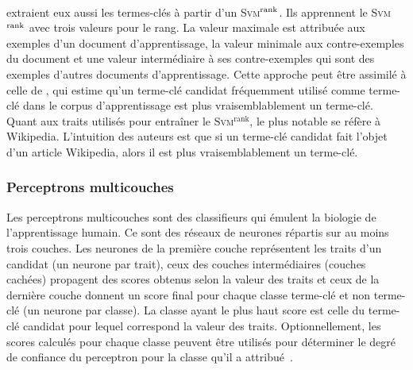         ~\\ extraient eux aussi les termes-clés à
        partir d'un \textsc{Svm}$^\textnormal{rank}$. Ils apprennent le
        \textsc{Svm}$^\textnormal{rank}$ avec trois valeurs pour le rang. La
        valeur maximale est attribuée aux exemples d'un document
        d'apprentissage, la valeur minimale aux contre-exemples du document et
        une valeur intermédiaire à ses contre-exemples qui sont des exemples
        d'autres documents d'apprentissage. Cette approche peut être assimilé à
        celle de , qui estime qu'un terme-clé
        candidat fréquemment utilisé comme terme-clé dans le corpus
        d'apprentissage est plus vraisemblablement un terme-clé. Quant aux
        traits utilisés pour entraîner le \textsc{Svm}$^\text{rank}$, le plus
        notable se réfère à Wikipedia. L'intuition des auteurs est que si un
        terme-clé candidat fait l'objet d'un article Wikipedia, alors il est
        plus vraisemblablement un terme-clé.

      \subsubsection{Perceptrons multicouches}
      \label{subsubsec:main-state_of_the_art-automatic_keyphrase_extraction-supervised_keyphrase_extraction-neural_network}
        Les perceptrons multicouches sont des classifieurs qui émulent la
        biologie de l'apprentissage humain. Ce sont des réseaux de neurones
        répartis sur au moins trois couches. Les neurones de la première couche
        représentent les traits d'un candidat (un neurone par trait), ceux des
        couches intermédiaires (couches cachées) propagent des scores obtenus
        selon la valeur des traits et ceux de la dernière couche donnent un
        score final pour chaque classe \og{}terme-clé\fg{} et \og{}non
        terme-clé\fg{} (un neurone par classe). La classe ayant le plus haut
        score est celle du terme-clé candidat pour lequel correspond la valeur
        des traits. Optionnellement, les scores calculés pour chaque classe
        peuvent être utilisés pour déterminer le degré de confiance du
        perceptron pour la classe qu'il a
        attribué~\cite{denker1991neuralnetprobability}.
        
